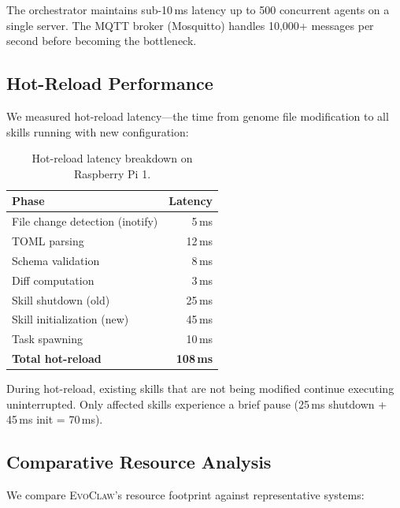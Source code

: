 \documentclass{article}
\newcommand{\evoclaw}{\textsc{EvoClaw}}
\begin{document}
The orchestrator maintains sub-10\,ms latency up to 500 concurrent agents on a single server. The MQTT broker (Mosquitto) handles 10,000+ messages per second before becoming the bottleneck.


\subsection{Hot-Reload Performance}

We measured hot-reload latency---the time from genome file modification to all skills running with new configuration:

\begin{table}[t]
\centering
\caption{Hot-reload latency breakdown on Raspberry Pi 1.}
\label{tab:hotreload}
\small
\begin{tabular}{lr}
\toprule
\textbf{Phase} & \textbf{Latency} \\
\midrule
File change detection (inotify) & 5\,ms \\
TOML parsing & 12\,ms \\
Schema validation & 8\,ms \\
Diff computation & 3\,ms \\
Skill shutdown (old) & 25\,ms \\
Skill initialization (new) & 45\,ms \\
Task spawning & 10\,ms \\
\midrule
\textbf{Total hot-reload} & \textbf{108\,ms} \\
\bottomrule
\end{tabular}
\end{table}

During hot-reload, existing skills that are not being modified continue executing uninterrupted. Only affected skills experience a brief pause (25\,ms shutdown + 45\,ms init = 70\,ms).


\subsection{Comparative Resource Analysis}

We compare \evoclaw{}'s resource footprint against representative systems:
\end{document}
